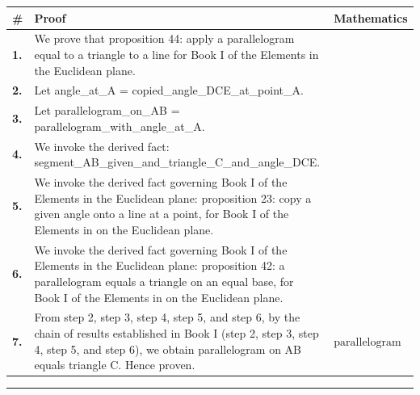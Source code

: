 \documentclass[11pt]{article}
\theoremstyle{definition}
\begin{document}
\begin{tabular}{@{} >{\raggedright\arraybackslash}p{} >{\raggedright\arraybackslash}p{} >{\raggedleft\arraybackslash}p{} @{}}
\textbf{\#} & \textbf{Proof} & \textbf{Mathematics} \\
\midrule
\textbf{1.} & We prove that proposition 44: apply a parallelogram equal to a triangle to a line for Book I of the Elements in the Euclidean plane. & \\[0.45em]
\textbf{2.} & Let angle\_at\_A = copied\_angle\_DCE\_at\_point\_A. & \\[0.45em]
\textbf{3.} & Let parallelogram\_on\_AB = parallelogram\_with\_angle\_at\_A. & \\[0.45em]
\textbf{4.} & We invoke the derived fact: segment\_AB\_given\_and\_triangle\_C\_and\_angle\_DCE. & \\[0.45em]
\textbf{5.} & We invoke the derived fact governing Book I of the Elements in the Euclidean plane: proposition 23: copy a given angle onto a line at a point, for Book I of the Elements in on the Euclidean plane. & \\[0.45em]
\textbf{6.} & We invoke the derived fact governing Book I of the Elements in the Euclidean plane: proposition 42: a parallelogram equals a triangle on an equal base, for Book I of the Elements in on the Euclidean plane. & \\[0.45em]
\textbf{7.} & From step 2, step 3, step 4, step 5, and step 6, by the chain of results established in Book I (step 2, step 3, step 4, step 5, and step 6), we obtain parallelogram on AB equals triangle C. Hence proven. & $\displaystyle \text{parallelogram on AB equals triangle C}$ \\[0.45em]
\bottomrule
\end{tabular}
\label{thm:Geometry-Euclid Book I-proposition_44_apply_a_parallelogram_equal_to_a_triangle_to_a_line}
\par\medskip\hrule
\end{document}
